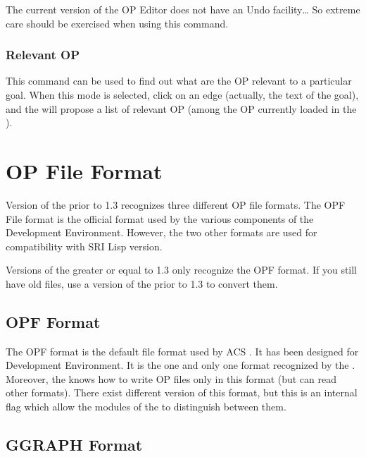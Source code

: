  The current version of the OP Editor does not have an
Undo facility\dots{} So extreme care should be exercised when using this
command.

\subsection{Relevant OP}

This command can be used to find out what are the OP relevant to a particular
goal. When this mode is selected, click on an edge (actually, the text of the
goal), and the \OPE{} will propose a list of relevant OP (among the OP
currently loaded in the \OPE{}). 

\chapter{OP File Format}

Version of the \OPE{} prior to 1.3 recognizes three different OP file
formats. The OPF File format is the official format used by the various
components of the \COPRS{} Development Environment. However, the two other
formats are used for compatibility with SRI Lisp \OPRS{} version.

Versions of the \OPE{} greater or equal to 1.3  only recognize the OPF
format. If you still have old files, use a version of the \OPE{} prior to 1.3
to convert them.




\section{OPF Format}

The OPF format is the default file format used by ACS \OPEditor. It has
been designed for \COPRS{} Development Environment. It is the one and
only one format recognized by the \CPK{}. Moreover, the \OPE{}
knows how to write OP files only in this format (but can read other
formats). There exist different version of this format, but this is an
internal flag which allow the modules of the \COPRSDE{} to distinguish
between them.

\section{GGRAPH Format}

